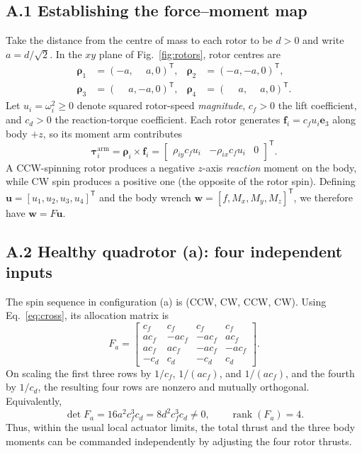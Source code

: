 \documentclass[10pt,a4paper]{article}
\newcommand{\eThree}{\mathbf e_3}
\begin{document}
\subsection*{A.1 Establishing the force--moment map}

Take the distance from the centre of mass to each rotor to be $d>0$ and write $a=d/\sqrt{2}$. In the $xy$ plane of Fig.~\ref{fig:rotors}, rotor centres are
\begin{equation}
\begin{aligned}
\boldsymbol\rho_1&=(-a,\phantom{-}a,0)^\mathsf{T},&
\boldsymbol\rho_2&=(-a,-a,0)^\mathsf{T},\\
\boldsymbol\rho_3&=(\phantom{-}a,-a,0)^\mathsf{T},&
\boldsymbol\rho_4&=(\phantom{-}a,\phantom{-}a,0)^\mathsf{T}.
\end{aligned}
\label{eq:rho}
\end{equation}
Let $u_i=\omega_i^2\geq0$ denote squared rotor-speed \emph{magnitude}, $c_f>0$ the lift coefficient, and $c_d>0$ the reaction-torque coefficient. Each rotor generates $\mathbf f_i=c_f u_i\eThree$ along body $+z$, so its moment arm contributes
\begin{equation}
\boldsymbol\tau_i^{\mathrm{arm}}=\boldsymbol\rho_i\times\mathbf f_i
=\begin{bmatrix} \rho_{iy}c_fu_i & -\rho_{ix}c_fu_i & 0\end{bmatrix}^{\mathsf T}.
\label{eq:cross}
\end{equation}
A CCW-spinning rotor produces a negative $z$-axis \emph{reaction} moment on the body, while CW spin produces a positive one (the opposite of the rotor spin). Defining
$\mathbf u=[u_1,u_2,u_3,u_4]^\mathsf T$ and the body wrench $\mathbf w=[f,M_x,M_y,M_z]^\mathsf T$, we therefore have $\mathbf w=F\mathbf u$.

\subsection*{A.2 Healthy quadrotor (a): four independent inputs}

The spin sequence in configuration (a) is (CCW, CW, CCW, CW). Using Eq.~\eqref{eq:cross}, its allocation matrix is
\begin{equation}
\boxed{F_a=\begin{bmatrix}
 c_f&c_f&c_f&c_f\\
 ac_f&-ac_f&-ac_f&ac_f\\
 ac_f&ac_f&-ac_f&-ac_f\\
 -c_d&c_d&-c_d&c_d
\end{bmatrix}.}
\label{eq:fa}
\end{equation}
On scaling the first three rows by $1/c_f$, $1/(ac_f)$, and $1/(ac_f)$, and the fourth by $1/c_d$, the resulting four rows are nonzero and mutually orthogonal. Equivalently,
\begin{equation}
\det F_a=16a^2c_f^3c_d=8d^2c_f^3c_d\ne0,
\qquad \boxed{\operatorname{rank}(F_a)=4.}
\label{eq:fa_rank}
\end{equation}
Thus, within the usual local actuator limits, the total thrust and the three body moments can be commanded independently by adjusting the four rotor thrusts.
\end{document}
